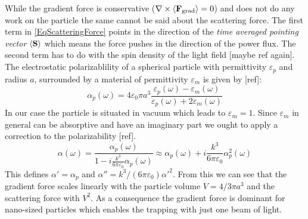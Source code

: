 While the gradient force is conservative ($\nabla\times\av{\field{F}{grad}}=0$) and does not do any work on the particle the same cannot be said about the scattering force. The first term in \autoref{EqScatteringForce} points in the direction of the \textit{time averaged pointing vector} $\av{\vc{S}}$ which means the force pushes in the direction of the power flux. The second term has to do with the spin density of the light field [maybe ref again].\\
The electrostatic polarizablility of a spherical particle with permittivity $\varepsilon_{\si{p}}$ and radius $a$, surrounded by a material of permittivity $\varepsilon_{\si{m}}$ is given by [ref]:
\begin{equation}
	\alpha_{\si{p}}(\omega)=4\varepsilon_0\pi a^3\frac{\varepsilon_{\si{p}}(\omega)-\varepsilon_{\si{m}}(\omega)}{\varepsilon_{\si{p}}(\omega)+2\varepsilon_{\si{m}}(\omega)}
\end{equation}
In our case the particle is situated in vacuum which leads to $\varepsilon_{\si{m}}=1$. Since $\varepsilon_{\si{m}}$ in general can be absorptive and have an imaginary part we ought to apply a correction to the polarizability [ref].
\begin{equation}\label{EqPolarizability}
	\alpha(\omega)=\frac{\alpha_{\si{p}}(\omega)}{1-i\frac{k^3}{6\pi\varepsilon_0}\alpha_{\si{p}}(\omega)}\approx\alpha_{\si{p}}(\omega)+i\frac{k^3}{6\pi\varepsilon_0}\alpha_{\si{p}}^2(\omega)
\end{equation}
This defines $\alpha'=\alpha_{\si{p}}$ and $\alpha''=k^3/(6\pi\varepsilon_0)\alpha'^2$. From this we can see that the gradient force scales linearly with the particle volume $V=4/3\pi a^3$ and the scattering force with $V^2$. As a consequence the gradient force is dominant for nano-sized particles which enables the trapping with just one beam of light.


